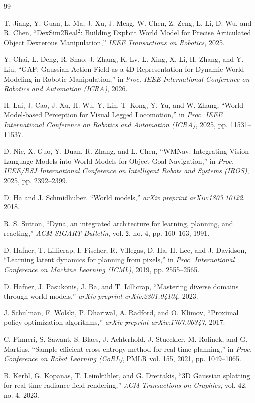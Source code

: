 \documentclass[12pt,a4paper,final]{extreport}
\begin{document}
\begingroup
{}
\begin{thebibliography}{99}

T. Jiang, Y. Guan, L. Ma, J. Xu, J. Meng, W. Chen, Z. Zeng, L. Li, D. Wu, and R. Chen, ``DexSim2Real$^2$: Building Explicit World Model for Precise Articulated Object Dexterous Manipulation,'' \textit{IEEE Transactions on Robotics}, 2025.

Y. Chai, L. Deng, R. Shao, J. Zhang, K. Lv, L. Xing, X. Li, H. Zhang, and Y. Liu, ``GAF: Gaussian Action Field as a 4D Representation for Dynamic World Modeling in Robotic Manipulation,'' in \textit{Proc. IEEE International Conference on Robotics and Automation (ICRA)}, 2026.

H. Lai, J. Cao, J. Xu, H. Wu, Y. Lin, T. Kong, Y. Yu, and W. Zhang, ``World Model-based Perception for Visual Legged Locomotion,'' in \textit{Proc. IEEE International Conference on Robotics and Automation (ICRA)}, 2025, pp. 11531--11537.

D. Nie, X. Guo, Y. Duan, R. Zhang, and L. Chen, ``WMNav: Integrating Vision-Language Models into World Models for Object Goal Navigation,'' in \textit{Proc. IEEE/RSJ International Conference on Intelligent Robots and Systems (IROS)}, 2025, pp. 2392--2399.

D. Ha and J. Schmidhuber, ``World models,'' \textit{arXiv preprint arXiv:1803.10122}, 2018.

R. S. Sutton, ``Dyna, an integrated architecture for learning, planning, and reacting,'' \textit{ACM SIGART Bulletin}, vol. 2, no. 4, pp. 160--163, 1991.

D. Hafner, T. Lillicrap, I. Fischer, R. Villegas, D. Ha, H. Lee, and J. Davidson, ``Learning latent dynamics for planning from pixels,'' in \textit{Proc. International Conference on Machine Learning (ICML)}, 2019, pp. 2555--2565.

D. Hafner, J. Pasukonis, J. Ba, and T. Lillicrap, ``Mastering diverse domains through world models,'' \textit{arXiv preprint arXiv:2301.04104}, 2023.

J. Schulman, F. Wolski, P. Dhariwal, A. Radford, and O. Klimov, ``Proximal policy optimization algorithms,'' \textit{arXiv preprint arXiv:1707.06347}, 2017.

C. Pinneri, S. Sawant, S. Blaes, J. Achterhold, J. Stueckler, M. Rolinek, and G. Martius, ``Sample-efficient cross-entropy method for real-time planning,'' in \textit{Proc. Conference on Robot Learning (CoRL)}, PMLR vol. 155, 2021, pp. 1049--1065.

B. Kerbl, G. Kopanas, T. Leimk\"uhler, and G. Drettakis, ``3D Gaussian splatting for real-time radiance field rendering,'' \textit{ACM Transactions on Graphics}, vol. 42, no. 4, 2023.

\end{thebibliography}
\endgroup
\end{document}
